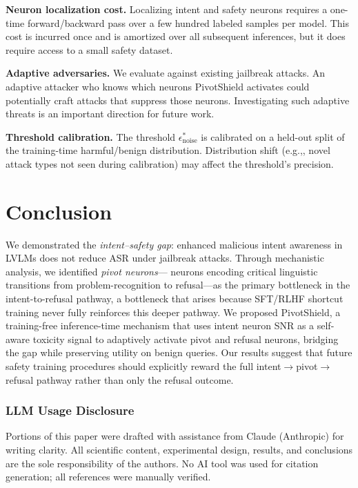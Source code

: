 \documentclass{article}
\newcommand{\method}{PivotShield\xspace}
\newcommand{\eg}{e.g.,\xspace}
\newcommand{\epsnoise}{\epsilon_{\mathrm{noise}}}
\begin{document}
\textbf{Neuron localization cost.}
Localizing intent and safety neurons requires a one-time
forward/backward pass over a few hundred labeled samples per model.
This cost is incurred once and is amortized over all subsequent
inferences, but it does require access to a small safety dataset.

\textbf{Adaptive adversaries.}
We evaluate against existing jailbreak attacks.
An adaptive attacker who knows which neurons \method activates
could potentially craft attacks that suppress those neurons.
Investigating such adaptive threats is an important direction for
future work.

\textbf{Threshold calibration.}
The threshold $\epsnoise^*$ is calibrated on a held-out split of
the training-time harmful/benign distribution.
Distribution shift (\eg, novel attack types not seen during
calibration) may affect the threshold's precision.

\section{Conclusion}
\label{sec:conclusion}

We demonstrated the \emph{intent--safety gap}: enhanced malicious
intent awareness in LVLMs does not reduce ASR under jailbreak
attacks.
Through mechanistic analysis, we identified \emph{pivot neurons}---
neurons encoding critical linguistic transitions from
problem-recognition to refusal---as the primary bottleneck in the
intent-to-refusal pathway, a bottleneck that arises because
SFT/RLHF shortcut training never fully reinforces this deeper
pathway.
We proposed \method, a training-free inference-time mechanism that
uses intent neuron SNR as a self-aware toxicity signal to
adaptively activate pivot and refusal neurons, bridging the gap
while preserving utility on benign queries.
Our results suggest that future safety training procedures should
explicitly reward the full intent$\to$pivot$\to$refusal
pathway rather than only the refusal outcome.

\subsubsection*{LLM Usage Disclosure}
Portions of this paper were drafted with assistance from Claude
(Anthropic) for writing clarity.
All scientific content, experimental design, results, and
conclusions are the sole responsibility of the authors.
No AI tool was used for citation generation;
all references were manually verified.
\end{document}
